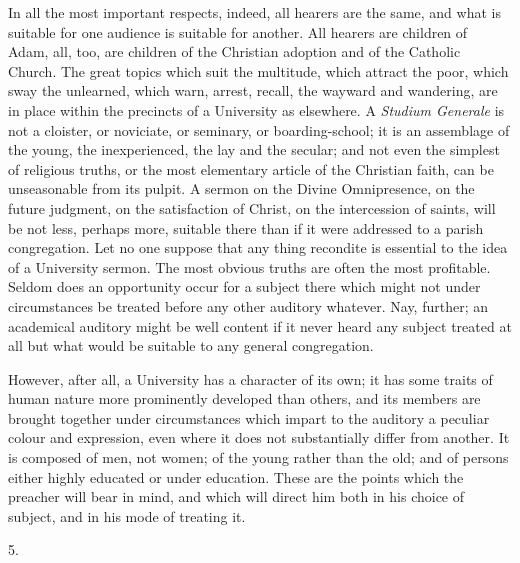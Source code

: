 In all the most important respects, indeed, all hearers are the
same, and what is suitable for one audience is suitable for another.
All hearers are children of Adam, all, too, are children of the
Christian adoption and of the Catholic Church. The great topics which
suit the multitude, which attract the poor, which sway the unlearned,
which warn, arrest, recall, the wayward and wandering, are in place
within the precincts of a University as elsewhere. A \emph{Studium
Generale} is not a cloister, or noviciate, or seminary, or
boarding-school; it is an assemblage of the young, the inexperienced,
the lay and the secular; and not even the simplest of religious
truths, or the most elementary article of the Christian faith, can be
unseasonable from its pulpit. A sermon on the Divine Omnipresence, on
the future judgment, on the satisfaction of Christ, on the
intercession of saints, will be not less, perhaps more, suitable there
than if it were addressed to a parish congregation. Let no one suppose
that any thing recondite is essential to the idea of a University
sermon. The most obvious truths are often the most profitable. Seldom
does an opportunity occur for a subject there which might not under
circumstances be treated before any other auditory whatever. Nay,
further; an academical auditory might be well content if it never
heard any subject treated at all but what would be suitable to any
general congregation.

However, after all, a University has a character of its own; it has
some traits of human nature more prominently developed than others,
and its members are brought together under circumstances which impart
to the auditory a peculiar colour and expression, even where it does
not substantially differ from another. It is composed of men, not
women; of the young rather than the old; and of persons either highly
educated or under education. These are the points which the preacher
will bear in mind, and which will direct him both in his choice of
subject, and in his mode of treating it.

5.

